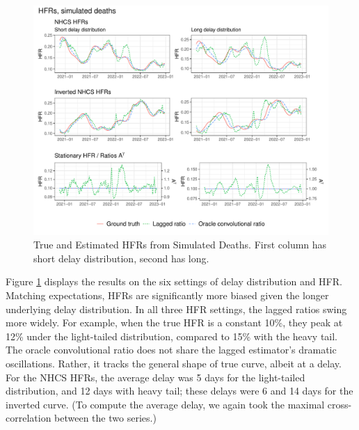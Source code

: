 \documentclass{article}
\renewcommand{\hat}{\widehat} %
\begin{document}
\begin{figure}
    \centering
    \includegraphics[width=\linewidth]{Figures/Simulated/simulated_results_corr_lag.pdf}
    \caption{True and Estimated HFRs from Simulated Deaths. First column has short delay distribution, second has long.}
    \label{fig:sims}
\end{figure}

Figure \ref{fig:sims} displays the results on the six settings of delay distribution and HFR. 
Matching expectations, HFRs are significantly more biased given the longer underlying delay distribution. 
In all three HFR settings, the lagged ratios swing more widely. For example, when the true HFR is a constant 10\%, they peak at 12\% under the light-tailed distribution, compared to 15\% with the heavy tail. The oracle convolutional ratio does not share the lagged estimator's dramatic oscillations. Rather, it tracks the general shape of true curve, albeit at a delay. For the NHCS HFRs, the average delay was 5 days for the light-tailed distribution, and 12 days with heavy tail; these delays were 6 and 14 days for the inverted curve. (To compute the average delay, we again took the maximal cross-correlation between the two series.)
\end{document}
